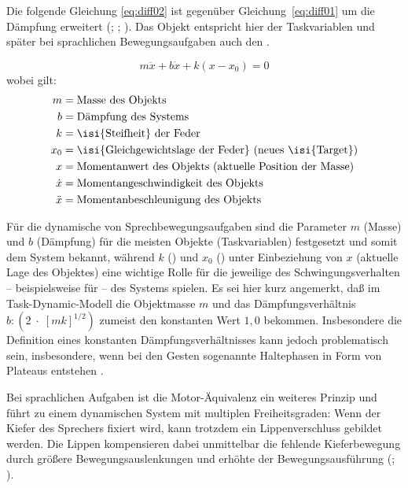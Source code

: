 Die folgende Gleichung \ref{eq:diff02} ist gegenüber Gleichung~\ref{eq:diff01} um die Dämpfung erweitert (\citealt{Saltzman1989}; \citealt{Hawkins1992}; \citealt{BrowmanGoldstein}). Das Objekt entspricht hier der Taskvariablen und später bei sprachlichen Bewegungsaufgaben auch den .

\begin{equation}
\label{eq:diff02}
m\ddot{x}+b\dot{x}+k\left(x-x_{0}\right)=0
\end{equation}
wobei gilt:
\begin{align*}
m = & \; \text{Masse des Objekts}\\%
b = & \; \text{Dämpfung des Systems}\\%
k = & \; \text{\isi{Steifheit} der Feder}\\%
x_{0} = & \; \text{\isi{Gleichgewichtslage der Feder} (neues \isi{Target})}\\%
x = & \; \text{Momentanwert des Objekts (aktuelle Position der Masse)}\\%
\dot{x} = & \; \text{Momentangeschwindigkeit des Objekts}\\%
\ddot{x} = & \; \text{Momentanbeschleunigung des Objekts}\\%
\end{align*}

Für die dynamische  von Sprechbewegungsaufgaben sind die Parameter $m$ (Masse) und $b$ (Dämpfung) für die meisten Objekte (Taskvariablen) festgesetzt und somit dem System bekannt, während $k$ () und ${x}_{0}$ () unter Einbeziehung von $x$ (aktuelle Lage des Objektes) eine wichtige Rolle für die jeweilige  des Schwingungsverhalten -- beispielsweise für  -- des Systems spielen. Es sei hier kurz angemerkt, daß im Task-Dynamic-Modell die Objektmasse  $m$ und das Dämpfungsverhältnis \(b:{\left(2\;{\cdot}\;{\left[{mk}\right]}^{1/{2}}\right)}\)  zumeist den konstanten Wert $1,0$ \citep{Hawkins1992} bekommen. Insbesondere die Definition eines konstanten Dämpfungsverhältnisses kann jedoch problematisch sein, insbesondere, wenn bei den Gesten sogenannte Haltephasen in Form von Plateaus entstehen \citep[vgl.][]{Fuchs2011}.

Bei sprachlichen Aufgaben ist die Motor-Äquivalenz ein weiteres Prinzip und führt zu einem dynamischen System mit multiplen Freiheitsgraden: Wenn der Kiefer des Sprechers fixiert wird, kann trotzdem ein Lippenverschluss gebildet werden. Die Lippen kompensieren dabei unmittelbar die fehlende Kieferbewegung durch größere Bewegungsauslenkungen und erhöhte  der Bewegungsausführung (\citealt{Kelso1984b}; \citealt{Ito2000}).

